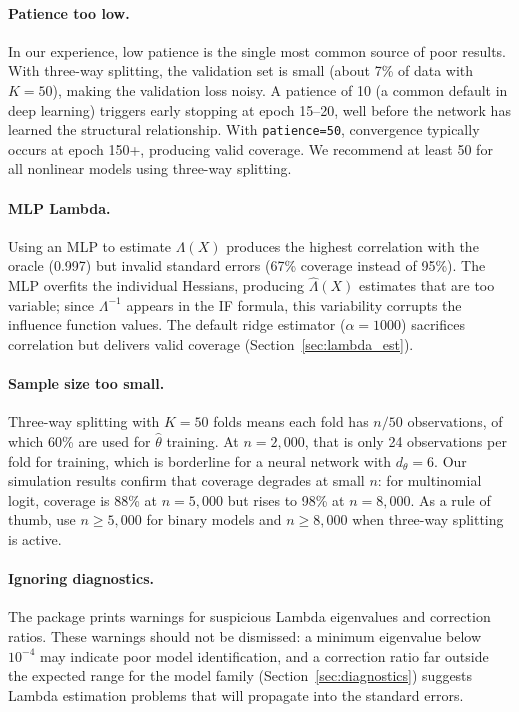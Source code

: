\paragraph{Patience too low.} In our experience, low patience is the single most common source of poor results. With three-way splitting, the validation set is small (about 7\% of data with $K=50$), making the validation loss noisy. A patience of 10 (a common default in deep learning) triggers early stopping at epoch 15--20, well before the network has learned the structural relationship. With \texttt{patience=50}, convergence typically occurs at epoch 150+, producing valid coverage. We recommend at least 50 for all nonlinear models using three-way splitting.

\paragraph{MLP Lambda.} Using an MLP to estimate $\Lambda(X)$ produces the highest correlation with the oracle (0.997) but invalid standard errors (67\% coverage instead of 95\%). The MLP overfits the individual Hessians, producing $\hat{\Lambda}(X)$ estimates that are too variable; since $\Lambda^{-1}$ appears in the IF formula, this variability corrupts the influence function values. The default ridge estimator ($\alpha = 1000$) sacrifices correlation but delivers valid coverage (Section~\ref{sec:lambda_est}).

\paragraph{Sample size too small.} Three-way splitting with $K=50$ folds means each fold has $n/50$ observations, of which 60\% are used for $\hat{\theta}$ training. At $n = 2{,}000$, that is only 24 observations per fold for training, which is borderline for a neural network with $d_\theta = 6$. Our simulation results confirm that coverage degrades at small $n$: for multinomial logit, coverage is 88\% at $n = 5{,}000$ but rises to 98\% at $n = 8{,}000$. As a rule of thumb, use $n \geq 5{,}000$ for binary models and $n \geq 8{,}000$ when three-way splitting is active.

\paragraph{Ignoring diagnostics.} The package prints warnings for suspicious Lambda eigenvalues and correction ratios. These warnings should not be dismissed: a minimum eigenvalue below $10^{-4}$ may indicate poor model identification, and a correction ratio far outside the expected range for the model family (Section~\ref{sec:diagnostics}) suggests Lambda estimation problems that will propagate into the standard errors.

